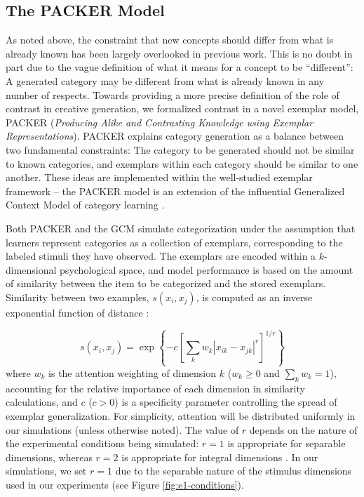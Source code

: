 \documentclass[12pt]{article}
\begin{document}
\begin{flushleft}
\subsection{The PACKER Model}

\label{section:PACKER-definition}

As noted above, the constraint that new concepts should differ from what is already known has been largely overlooked in previous work. This is no doubt in part due to the vague definition of what it means for a concept to be ``different'': A generated category may be different from what is already known in any number of respects. Towards providing a more precise definition of the role of contrast in creative generation, we formalized contrast in a novel exemplar model, PACKER  ({\em Producing Alike and Contrasting Knowledge using Exemplar Representations}). PACKER explains category generation as a balance between two fundamental constraints: The category to be generated should not be similar to known categories, and exemplars within each category should be similar to one another. These ideas are implemented within the well-studied exemplar framework -- the PACKER model is an extension of the influential Generalized Context Model of category learning \citep[GCM;][]{nosofsky1984choice,nosofsky1986attention}. 

Both PACKER and the GCM simulate categorization under the assumption that learners represent categories as a collection of exemplars, corresponding to the labeled stimuli they have observed. The exemplars are encoded within a $k$-dimensional psychological space, and model performance is based on the amount of similarity between the item to be categorized and the stored exemplars. Similarity between two examples, $s\left(x_i, x_j\right)$, is computed as an inverse exponential function of distance \citep[following][]{attneave1950,shepard1957stimulus,shepard1987toward}:

\begin{equation}
s\left(x_i,x_j\right) = \exp \left\{ -c \left[\sum_{k}{ w_k \left| x_{ik} - x_{jk} \right|^r }\right]^{1/r} \right\}
\label{eq:similarity}
\end{equation}
% 
where $w_k$ is the attention weighting of dimension $k$ ($w_k \geq 0$ and $\sum_k{w_k} = 1$), accounting for the relative importance of each dimension in similarity calculations, and $c$ ($c>0$) is a specificity parameter controlling the spread of exemplar generalization. For simplicity, attention will be distributed uniformly in our simulations (unless otherwise noted). The value of $r$ depends on the nature of the experimental conditions being simulated: $r=1$ is appropriate for separable dimensions, whereas $r=2$ is appropriate for integral dimensions \citep[e.g.,][]{shepard1964attention,garner1974processing}. In our simulations, we set $r=1$ due to the separable nature of the stimulus dimensions used in our experiments (see Figure \ref{fig:e1-conditions}).



\end{flushleft}
\end{document}
